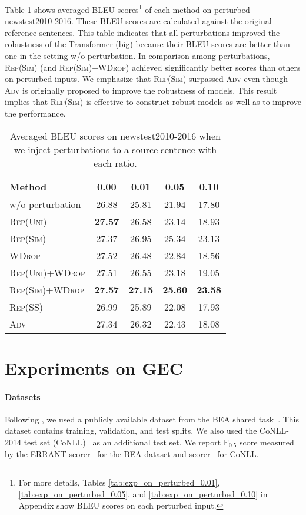 \documentclass[11pt]{article}
\newcommand{\fscore}{\ensuremath{\mathrm{F}_{0.5}}}
\newcommand{\uniform}{\textsc{Rep(Uni)}}
\newcommand{\parass}{\textsc{Rep(SS)}}
\newcommand{\similarity}{\textsc{Rep(Sim)}}
\newcommand{\worddrop}{\textsc{WDrop}}
\newcommand{\adv}{\textsc{Adv}}
\begin{document}
Table \ref{tab:exp_on_perturbed_input} shows averaged BLEU scores\footnote{For more details, Tables \ref{tab:exp_on_perturbed_0.01}, \ref{tab:exp_on_perturbed_0.05}, and \ref{tab:exp_on_perturbed_0.10} in Appendix show BLEU scores on each perturbed input.} of each method on perturbed newstest2010-2016.
These BLEU scores are calculated against the original reference sentences.
This table indicates that all perturbations improved the robustness of the Transformer (big) because their BLEU scores are better than one in the setting w/o perturbation.
In comparison among perturbations, \similarity{} (and \similarity{}+\worddrop{}) achieved significantly better scores than others on perturbed inputs.
We emphasize that \similarity{} surpassed \adv{} even though \adv{} is originally proposed to improve the robustness of models.
This result implies that \similarity{} is effective to construct robust models as well as to improve the performance.


\begin{table}[!t]
  \centering
  \footnotesize
  \begin{tabular}{ l | c | c | c | c } \hline
  Method & 0.00 & 0.01 & 0.05 & 0.10 \\ \hline 
  w/o perturbation & 26.88 & 25.81 & 21.94 & 17.80 \\ \hline
  \uniform{} & \textbf{27.57} & 26.58 & 23.14 & 18.93 \\
  \similarity{} & 27.37 & 26.95 & 25.34 & 23.13 \\
  \worddrop{} & 27.52 & 26.48 & 22.84 & 18.56 \\
  \uniform{}+\worddrop{} & 27.51 & 26.55 & 23.18 & 19.05\\
  \similarity{}+\worddrop{} & \textbf{27.57} & \textbf{27.15} & \textbf{25.60} & \textbf{23.58} \\
  \parass{} & 26.99 & 25.89 & 22.08 & 17.93 \\
  \adv{} & 27.34 & 26.32 & 22.43 & 18.08 \\ \hline
  \end{tabular}
  \caption{Averaged BLEU scores on newstest2010-2016 when we inject perturbations to a source sentence with each ratio.\label{tab:exp_on_perturbed_input}}
\end{table}


\section{Experiments on GEC}
\label{sec:gec}


\paragraph{Datasets}
Following , we used a publicly available dataset from the BEA shared task~\cite{bryant:2019:bea}.
This dataset contains training, validation, and test splits.
We also used the CoNLL-2014 test set (CoNLL)~\citep{ng:2014:conll} as an additional test set.
We report \fscore{} score measured by the ERRANT scorer~\cite{bryant:2017:automatic,felice:2016:automatic} for the BEA dataset and  scorer~\cite{dahlmeier:2012:M2} for CoNLL.
\end{document}
